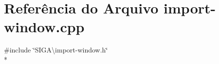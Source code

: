 \section{Referência do Arquivo import-\/window.cpp}
\label{import-window_8cpp}
{\ttfamily \#include \char`\"{}S\+I\+G\+A\textbackslash{}import-\/window.\+h\char`\"{}}\\*
